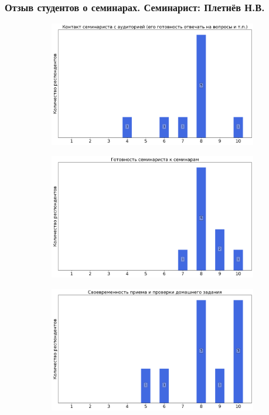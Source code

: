     \subsubsection{Отзыв студентов о семинарах. Семинарист: Плетнёв Н.В.}
		\begin{figure}[H]
			\centering
			\begin{subfigure}[b]{0.45\textwidth}
				\centering
				\includegraphics[width=\textwidth]{images/1 course/Дискретный анализ/seminarists-marks-Плетнёв Н.В.-0.png}
			\end{subfigure}
			\begin{subfigure}[b]{0.45\textwidth}
				\centering
				\includegraphics[width=\textwidth]{images/1 course/Дискретный анализ/seminarists-marks-Плетнёв Н.В.-1.png}
			\end{subfigure}
			\begin{subfigure}[b]{0.45\textwidth}
				\centering
				\includegraphics[width=\textwidth]{images/1 course/Дискретный анализ/seminarists-marks-Плетнёв Н.В.-2.png}

\end{subfigure}
\end{figure}
